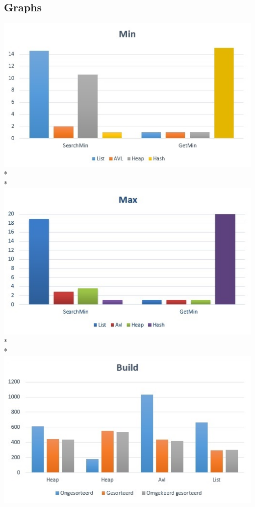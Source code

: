 \documentclass{article}
\begin{document}
\subsection{Graphs}
\includegraphics{MinGrafiek}\\*\\*
\includegraphics{MaxGrafiek} \\*\\*
\includegraphics{BuildGrafiek}
\end{document}
